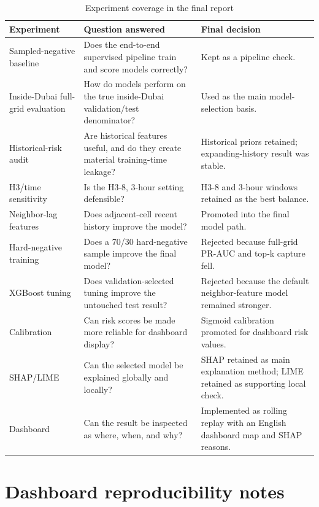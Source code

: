 \begin{table}[H]
\centering
\caption{Experiment coverage in the final report}
\label{tab:appendix_experiment_coverage}
\scriptsize
\begin{tabularx}{\textwidth}{L{0.25\textwidth}Y Y}
\toprule
\textbf{Experiment} & \textbf{Question answered} & \textbf{Final decision} \\
\midrule
Sampled-negative baseline & Does the end-to-end supervised pipeline train and score models correctly? & Kept as a pipeline check. \\
Inside-Dubai full-grid evaluation & How do models perform on the true inside-Dubai validation/test denominator? & Used as the main model-selection basis. \\
Historical-risk audit & Are historical features useful, and do they create material training-time leakage? & Historical priors retained; expanding-history result was stable. \\
H3/time sensitivity & Is the H3-8, 3-hour setting defensible? & H3-8 and 3-hour windows retained as the best balance. \\
Neighbor-lag features & Does adjacent-cell recent history improve the model? & Promoted into the final model path. \\
Hard-negative training & Does a 70/30 hard-negative sample improve the final model? & Rejected because full-grid PR-AUC and top-k capture fell. \\
XGBoost tuning & Does validation-selected tuning improve the untouched test result? & Rejected because the default neighbor-feature model remained stronger. \\
Calibration & Can risk scores be made more reliable for dashboard display? & Sigmoid calibration promoted for dashboard risk values. \\
SHAP/LIME & Can the selected model be explained globally and locally? & SHAP retained as main explanation method; LIME retained as supporting local check. \\
Dashboard & Can the result be inspected as where, when, and why? & Implemented as rolling replay with an English dashboard map and SHAP reasons. \\
\bottomrule
\end{tabularx}
\end{table}

\section{Dashboard reproducibility notes}

